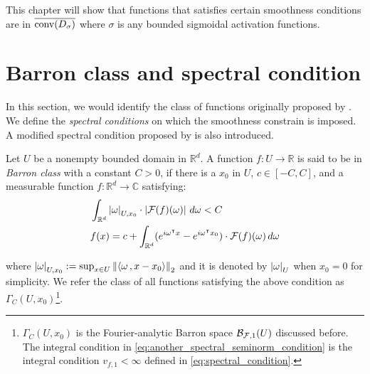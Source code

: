 This chapter will show that functions that satisfies certain smoothness
conditions are in $\overline{\operatorname*{conv}(D_{\sigma})}$ where $\sigma$ is any bounded
sigmoidal activation functions.


\section{Barron class and spectral condition}
\label{sec:spectral_condition}

In this section, we would identify the class of functions originally proposed by
\cite{barronUniversalApproximationBounds1993}. We define the \textit{spectral
conditions} on which the smoothness constrain is imposed. A modified spectral
condition proposed by \cite{siegelCharacterizationVariationSpaces2022} is
also introduced.

\begin{definition}
    \label{def:barron_class}
    Let $U$ be a nonempty bounded domain in $\mathbb{R}^d$. A function $f: U \to
    \mathbb{R}$ is said to be in \textit{Barron class} with a constant $C > 0$,
    if there is a $x_0$ in $U$, $c \in [-C, C]$, and a measurable function $f:
    \mathbb{R}^d \to \mathbb{C}$ satisfying:
    \begin{align}
        & \int_{\mathbb{R}^d} \left| \omega \right|_{U, x_0} 
        \cdot \left| \mathcal{F}(f)(\omega) \right| \,d\omega < C 
        \label{eq:another_spectral_seminorm_condition} \\
        & f(x) = c + \int_{\mathbb{R}^d} (
            e^{i\omega{}^{\intercal} x} - e^{i\omega{}^{\intercal} x_0}
        ) \cdot \mathcal{F}(f)(\omega)\,d\omega
    \end{align}

    where $\left| \omega \right|_{U, x_0} := \sup_{x\in U}\left\| \left\langle \omega\, , x - x_0 \right\rangle \right\|_2$
    and it is denoted by $\left| \omega \right|_U$ when $x_0 = 0$ for simplicity. We
    refer the class of all functions satisfying the above condition as 
    $\Gamma_C(U, x_0)$\footnote{
        $\Gamma_C(U, x_0)$ is the Fourier-analytic Barron space
        $\mathcal{B}_{\mathcal{F}, 1}(U)$ discussed before. The integral condition in
        \eqref{eq:another_spectral_seminorm_condition} is the integral condition
        $v_{f,1} < \infty$ defined in \eqref{eq:spectral_condition}.
    }.
\end{definition}



